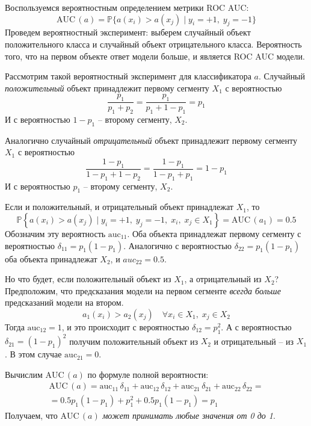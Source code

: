 \documentclass[12pt,fleqn]{article}
\begin{document}
    \begin{esSolution}
        Воспользуемся вероятностным определением метрики ROC AUC:
        $$
            \text{AUC}\,(a) = \mathbb P \big \{ a(x_i) > a(x_j)\; |\; y_i = +1,\; y_j = -1 \big \}
        $$
        Проведем вероятностный эксперимент: выберем случайный объект положительного класса и случайный объект отрицательного класса.
        Вероятность того, что на первом объекте ответ модели больше, и является ROC AUC модели.
        
        Рассмотрим такой вероятностный эксперимент для классификатора $ a $.
        Случайный \textit{положительный} объект принадлежит первому сегменту $ X_1 $ с вероятностью
        $$
            \dfrac{p_1}{p_1 + p_2} = \dfrac{p_1}{p_1 + 1 - p_1} = p_1
        $$
        И с вероятностью $ 1 - p_1 $ – второму сегменту, $ X_2 $.
        
        Аналогично случайный \textit{отрицательный} объект принадлежит первому сегменту $ X_1 $ с вероятностью 
        $$
            \dfrac{1 - p_1}{1 - p_1 + 1 - p_2} = \dfrac{1 - p_1}{1 - p_1 +  p_1} = 1 - p_1
        $$
        И с вероятностью $ p_1 $ – второму сегменту, $ X_2 $.
        
        Если и положительный, и отрицательный объект принадлежат $ X_1 $, то
        $$
            \mathbb{P} \left\{ a(x_i) > a(x_j)\; |\; y_i = +1,\; y_j = -1,\; x_i,\; x_j \in X_1  \right\}
            =
            \text{AUC}\,(a_1) = 0.5
        $$
        Обозначим эту вероятность $ \text{auc}_{11} $.
        Оба объекта принадлежат первому сегменту с вероятностью $ \delta_{11} = p_1 (1 - p_1) $.
        Аналогично с вероятностью $ \delta_{22} = p_1 (1 - p_1) $ оба объекта принадлежат $ X_2 $, и $ auc_{22}=0.5 $.
        
        Но что будет, если положительный объект из $ X_1 $, а отрицательный из $ X_2 $?
        Предположим, что предсказания модели на первом сегменте \textit{всегда больше} предсказаний модели на втором.
        $$
            a_1(x_i) > a_2(x_j)\quad \forall x_i \in X_1,\; x_j \in X_2
        $$
        Тогда $ \text{auc}_{12} = 1 $, и это происходит с вероятностью $ \delta_{12} = p_1 ^ 2 $.
        А с вероятностью $ \delta_{21} = (1 - p_1) ^ 2$ получим положительный объект из $ X_2 $ и отрицательный – из $ X_1 $.
        В этом случае $ \text{auc}_{21} = 0 $.
        
        Вычислим $ \text{AUC}\,(a) $ по формуле полной вероятности:
        \begin{multline*}
            \text{AUC}\,(a)
            =
            \text{auc}_{11}\,\delta_{11} + \text{auc}_{12}\,\delta_{12} + \text{auc}_{21}\,\delta_{21} + \text{auc}_{22}\,\delta_{22}
            = \\ =
            0.5 p_1(1 - p_1) + p_1^2 + 0.5 p_1(1 - p_1)
            =
            p_1
        \end{multline*}
        Получаем, что $ \text{AUC}\,(a) $ \textit{может принимать любые значения от 0 до 1}.
        

\end{esSolution}
\end{document}
